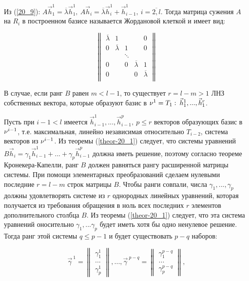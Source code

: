 Из (\ref{20_9}): $A\vec{h}_1^1 = \overline{\lambda} \vec{h}_1^1, \: A\vec{h}_i = \overline{\lambda} \vec{h}_i^1 + \vec{h}_{i-1}^1, \: i = \overline{2,l}$. Тогда матрица сужения $A$ на $R_i$ в построенном базисе называется Жордановой клеткой и имеет вид:

\begin{equation*}
\begin{Vmatrix}
    \overline{\lambda} & 1 & & & 0 \\
    0 & \overline{\lambda} & 1 & & 0 \\
      & & \ddots & & \\
    0 & & 0 & \overline{\lambda} & 1 \\
    0 & & & 0 & \overline{\lambda} \\
\end{Vmatrix}
\end{equation*}

В случае, если ранг $B$ равен $m < l - 1$, то существует $r = l - m > 1$ ЛНЗ собственных вектора, которые образуют базис в $\nu^1 = T_1 : \: \vec{h}_1^1, ... , \vec{h}_1^r$.

Пусть при $i-1 < l$ имеется $\vec{h}_{i-1}^1, ... , \vec{h}_{i-1}^p, \: p \leq r$ векторов образующих базис в $\nu^{i-1}$, т.е. максимальная, линейно независимая относительно $T_{i-2}$, система векторов из $\nu^{i-1}$.  Из теоремы (\ref{theor-20_1}) следует, что системы уравнений $B\vec{h}_i = \gamma_1 \vec{h}_{i-1}^1 + ... + \gamma_p \vec{h}_{i-1}^p$ должна иметь решение, поэтому согласно теореме Кронекера-Капелли, ранг $B$ должен равняться рангу расширенной матрицы системы. При помощи элементарных преобразований сделаем нулевыми последние $r = l - m$ строк матрицы $B$. Чтобы ранги совпали, числа $\gamma_1, ... , \gamma_p$ должны удовлетворять системе из $r$ однородных линейных уравнений, которая получается из требования обращения в ноль всех последних $r$ элементов дополнительного столбца $B$. Из теоремы (\ref{theor-20_1}) следует, что эта система уравнений оносительно $\gamma_1, ... \gamma_p$ будет иметь хотя бы одно ненулевое решение. Тогда ранг этой системы $q \leq p - 1$ и будет существовать $p-q$ наборов:

\begin{equation*}
\vec{\gamma}^{\: 1} =
\begin{Vmatrix}
    \gamma_1^1 \\
    ...         \\
    \gamma_p^1
\end{Vmatrix}
, ... ,
\vec{\gamma}^{\: p-q} = 
\begin{Vmatrix}
    \gamma_1^{p-q} \\
    ...         \\
    \gamma_p^{p-q}
\end{Vmatrix}
,
\end{equation*} 

